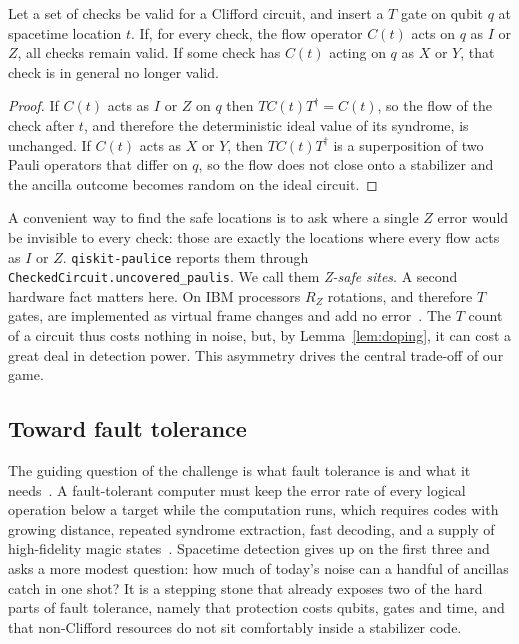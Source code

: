 \begin{lemma}
\label{lem:doping}
Let a set of checks be valid for a Clifford circuit, and insert a $T$ gate on qubit $q$ at spacetime location $t$. If, for every check, the flow operator $C(t)$ acts on $q$ as $I$ or $Z$, all checks remain valid. If some check has $C(t)$ acting on $q$ as $X$ or $Y$, that check is in general no longer valid.
\end{lemma}
\begin{proof}
If $C(t)$ acts as $I$ or $Z$ on $q$ then $T C(t) T^\dagger=C(t)$, so the flow of the check after $t$, and therefore the deterministic ideal value of its syndrome, is unchanged. If $C(t)$ acts as $X$ or $Y$, then $TC(t)T^\dagger$ is a superposition of two Pauli operators that differ on $q$, so the flow does not close onto a stabilizer and the ancilla outcome becomes random on the ideal circuit.
\end{proof}

A convenient way to find the safe locations is to ask where a single $Z$ error would be invisible to every check: those are exactly the locations where every flow acts as $I$ or $Z$. \texttt{qiskit-paulice} reports them through \texttt{CheckedCircuit.uncovered\_paulis}. We call them \emph{Z-safe sites}. A second hardware fact matters here. On IBM processors $R_Z$ rotations, and therefore $T$ gates, are implemented as virtual frame changes and add no error~\cite{mckay2017virtualz}. The $T$ count of a circuit thus costs nothing in noise, but, by Lemma~\ref{lem:doping}, it can cost a great deal in detection power. This asymmetry drives the central trade-off of our game.

\subsection{Toward fault tolerance}
The guiding question of the challenge is what fault tolerance is and what it needs~\cite{ibm_blog_ft}. A fault-tolerant computer must keep the error rate of every logical operation below a target while the computation runs, which requires codes with growing distance, repeated syndrome extraction, fast decoding, and a supply of high-fidelity magic states~\cite{fowler2012surface,bravyi2024high,google2025below,bravyi2005magic}. Spacetime detection gives up on the first three and asks a more modest question: how much of today's noise can a handful of ancillas catch in one shot? It is a stepping stone that already exposes two of the hard parts of fault tolerance, namely that protection costs qubits, gates and time, and that non-Clifford resources do not sit comfortably inside a stabilizer code.
